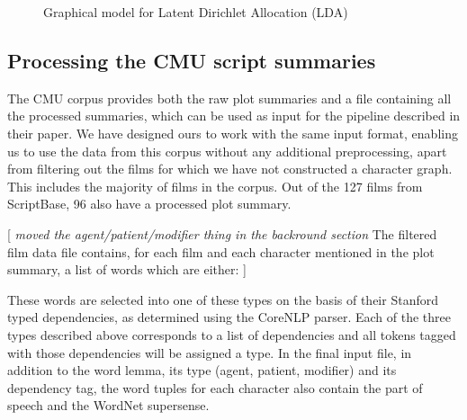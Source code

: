 \documentclass[bsc,frontabs,singlespacing,parskip]{infthesis} %
\begin{document}
\begin{figure}[h!]
\centering
{}
\caption{Graphical model for Latent Dirichlet Allocation (LDA)}
\label{fig:lda}
\end{figure}


\subsection{Processing the CMU script summaries}
The CMU corpus provides both the raw plot summaries and a file containing all the processed summaries, which can be used as input for the pipeline described in their paper. We have designed ours to work with the same input format, enabling us to use the data from this corpus without any additional preprocessing, apart from filtering out the films for which we have not constructed a character graph. This includes the majority of films in the corpus. Out of the 127 films from ScriptBase, 96 also have a processed plot summary.


[ \textit{moved the agent/patient/modifier thing in the backround section}
The filtered film data file contains, for each film and each character mentioned in the plot summary, a list of words which are either:
]

These words are selected into one of these types on the basis of their Stanford typed dependencies, as determined using the CoreNLP parser. Each of the three types described above corresponds to a list of dependencies and all tokens tagged with those dependencies will be assigned a type. In the final input file, in addition to the word lemma, its type (agent, patient, modifier) and its dependency tag, the word tuples for each character also contain the part of speech and the WordNet supersense.
\end{document}
